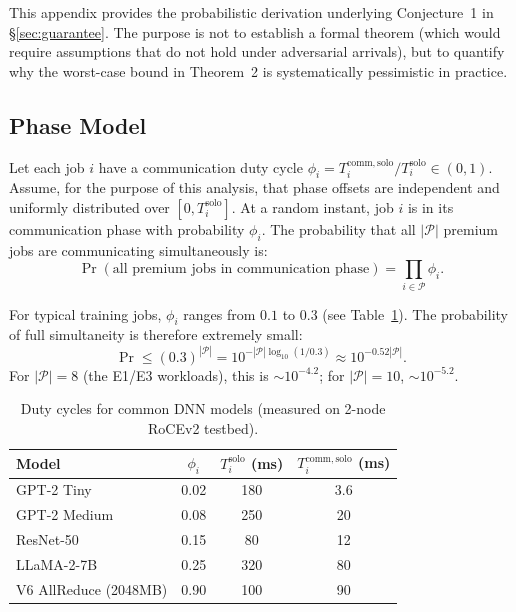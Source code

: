 This appendix provides the probabilistic derivation underlying Conjecture~1 in \S\ref{sec:guarantee}. The purpose is not to establish a formal theorem (which would require assumptions that do not hold under adversarial arrivals), but to quantify why the worst-case bound in Theorem~2 is systematically pessimistic in practice.

\subsection{Phase Model}

Let each job $i$ have a communication duty cycle $\phi_i = T_i^{\mathrm{comm,solo}} / T_i^{\mathrm{solo}} \in (0,1)$. Assume, for the purpose of this analysis, that phase offsets are independent and uniformly distributed over $[0, T_i^{\mathrm{solo}}]$. At a random instant, job $i$ is in its communication phase with probability $\phi_i$. The probability that all $|\mathcal{P}|$ premium jobs are communicating simultaneously is:
\begin{equation}
\Pr(\text{all premium jobs in communication phase}) = \prod_{i\in\mathcal{P}} \phi_i.
\end{equation}

For typical training jobs, $\phi_i$ ranges from $0.1$ to $0.3$ (see Table~\ref{tab:duty}). The probability of full simultaneity is therefore extremely small:
\begin{equation*}
\Pr \le (0.3)^{|\mathcal{P}|} = 10^{-|\mathcal{P}| \log_{10}(1/0.3)} \approx 10^{-0.52|\mathcal{P}|}.
\end{equation*}
For $|\mathcal{P}| = 8$ (the E1/E3 workloads), this is $\sim 10^{-4.2}$; for $|\mathcal{P}| = 10$, $\sim 10^{-5.2}$.

\begin{table}[h]
\centering
\caption{Duty cycles for common DNN models (measured on 2-node RoCEv2 testbed).}
\label{tab:duty}
\footnotesize
\begin{tabular}{@{}l c c c@{}}
\toprule
\textbf{Model} & $\phi_i$ & $T_i^{\mathrm{solo}}$ (ms) & $T_i^{\mathrm{comm,solo}}$ (ms) \\
\midrule
GPT-2 Tiny & 0.02 & 180 & 3.6 \\
GPT-2 Medium & 0.08 & 250 & 20 \\
ResNet-50 & 0.15 & 80 & 12 \\
LLaMA-2-7B & 0.25 & 320 & 80 \\
V6 AllReduce (2048MB) & 0.90 & 100 & 90 \\
\bottomrule
\end{tabular}
\end{table}


